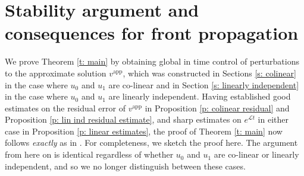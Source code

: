 \documentclass[11pt]{article}
\newcommand{\mcl}{\mathcal{L}}
\numberwithin{equation}{section}
\numberwithin{prop}{section}
\begin{document}




\section{Stability argument and consequences for front propagation}\label{s: stability argument}
We prove Theorem \ref{t: main} by obtaining global in time control of perturbations to the approximate solution $v^\mathrm{app}$, which was constructed in Sections \ref{s: colinear} in the case where $u_0$ and $u_1$ are co-linear and in Section \ref{s: linearly independent} in the case where $u_0$ and $u_1$ are linearly independent. Having established good estimates on the residual error of $v^\mathrm{app}$ in Proposition \ref{p: colinear residual} and Proposition \ref{p: lin ind residual estimate}, and sharp estimates on $e^{\mcl t}$ in either case in Proposition \ref{p: linear estimates}, the proof of Theorem \ref{t: main} now follows \emph{exactly} as in \cite{CAMS}. For completeness, we sketch the proof here. The argument from here on is identical regardless of whether $u_0$ and $u_1$ are co-linear or linearly independent, and so we no longer distinguish between these cases. 
\end{document}
